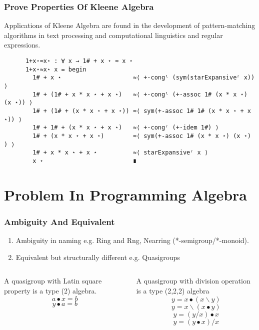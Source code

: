 \documentclass[xcolor={dvipsnames}]{beamer}
\begin{document}

\begin{frame}[fragile]
    \frametitle{Prove Properties Of Kleene Algebra}  
    Applications of Kleene Algebra are found in the development of
    pattern-matching algorithms in text processing and computational linguistics
    and regular expressions.
    \\
    \begin{verbatim}
      1+x⋆≈x⋆ : ∀ x → 1# + x ⋆ ≈ x ⋆
      1+x⋆≈x⋆ x = begin
        1# + x ⋆                    ≈⟨ +-congˡ (sym(starExpansiveʳ x)) ⟩ 
        1# + (1# + x * x ⋆ + x ⋆)   ≈⟨ +-congˡ (+-assoc 1# (x * x ⋆) (x ⋆)) ⟩ 
        1# + (1# + (x * x ⋆ + x ⋆)) ≈⟨ sym(+-assoc 1# 1# (x * x ⋆ + x ⋆)) ⟩ 
        1# + 1# + (x * x ⋆ + x ⋆)   ≈⟨ +-congʳ (+-idem 1#) ⟩ 
        1# + (x * x ⋆ + x ⋆)        ≈⟨ sym(+-assoc 1# (x * x ⋆) (x ⋆) ) ⟩ 
        1# + x * x ⋆ + x ⋆          ≈⟨ starExpansiveʳ x ⟩ 
        x ⋆                         ∎
      \end{verbatim}
  \end{frame}


\section{Problem In Programming Algebra}

\begin{frame}
  \frametitle{Ambiguity And Equivalent}
  \begin{enumerate}
    \item Ambiguity in naming e.g. Ring and Rng, Nearring (*-semigroup/*-monoid). 
    \item Equivalent but structurally different e.g. Quasigroups
  \end{enumerate}
  \begin{columns}
    \begin{column}{0.4\textwidth}
      A quasigroup with Latin square property is a type (2) algebra.
      \[a ∙ x = b\]
      \[y ∙ a = b\]
    \end{column}
    \begin{column}{0.575\textwidth}
      A quasigroup with division operation is a type (2,2,2) algebra
      \[y=x∙(x\backslash y)\]
      \[y=x\backslash(x∙y)\]
      \[y=(y/x)∙x\]
      \[y=(y∙x)/x\]
    \end{column}
  \end{columns}
\end{frame}
\end{document}
